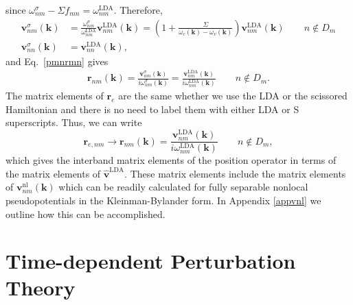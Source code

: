 since
$\omega^\sigma_{nm}-\Sigma f_{mn}=\omega^{\mathrm{LDA}}_{nm}$. Therefore, 
\begin{align}\label{chon.9}
\mathbf{v}^\sigma_{nm}(\mathbf{k})
&=
\frac{\omega^\sigma_{nm}}{\omega^{\mathrm{LDA}}_{nm}}\mathbf{v}^\mathrm{LDA}_{nm}(\mathbf{k})
=\left(1+\frac{\Sigma}{\omega_c(\mathbf{k})-\omega_v(\mathbf{k})}\right)\mathbf{v}^\mathrm{LDA}_{nm}(\mathbf{k})
\quad\quad n\notin D_m
\nonumber\\
\mathbf{v}^\sigma_{nn}(\mathbf{k})
&=
\mathbf{v}^\mathrm{LDA}_{nn}(\mathbf{k})
,
\end{align} 
and Eq.~\eqref{pmnrmn} gives
\begin{align}\label{chon.10}
\mathbf{r}_{nm}(\mathbf{k})
=
\frac{\mathbf{v}^\sigma_{nm}(\mathbf{k})}{i\omega^\sigma_{nm}(\mathbf{k})}
=
\frac{\mathbf{v}^\mathrm{LDA}_{nm}(\mathbf{k})}{i\omega^{\mathrm{LDA}}_{nm}(\mathbf{k})}
\quad\quad n\notin D_m
.
\end{align}
The matrix elements
of $\mathbf{r}_e$ are the same whether we use the LDA or the scissored
Hamiltonian and there is no need to label them with either LDA
or S superscripts. Thus,
we can write
\begin{equation}\label{chon.98}
\mathbf{r}_{e,nm}\to
\mathbf{r}_{nm}(\mathbf{k})=\frac{\mathbf{v}^\mathrm{LDA}_{nm}(\mathbf{k})}{i\omega^{\mathrm{LDA}}_{nm}(\mathbf{k})}
\quad\quad n\notin D_m
,
\end{equation}   
which gives the interband matrix elements of the position operator
in terms of the matrix elements of $\hat{\mathbf{v}}^\mathrm{LDA}$. 
These matrix elements include the matrix elements of
$\mathbf{v}^{\mathrm{nl}}_{nm}(\mathbf{k})$ which can be readily calculated\cite{francesco} for 
fully separable nonlocal pseudopotentials in the 
Kleinman-Bylander 
form.\cite{mottaCMS10,kleinmanPRL82,adolphPRB96}
In Appendix \ref{appvnl} we outline how this  
can be accomplished. 

\section{Time-dependent Perturbation Theory}\label{tdpt}

